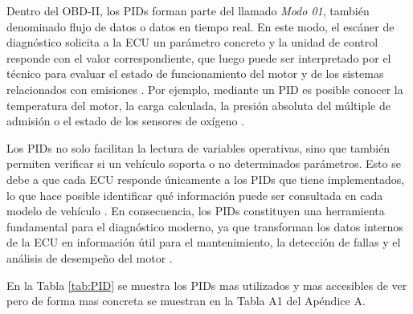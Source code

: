 Dentro del OBD-II, los PIDs forman parte del llamado \textit{Modo 01}, también denominado flujo de datos o datos en tiempo real. En este modo, el escáner de diagnóstico solicita a la ECU un parámetro concreto y la unidad de control responde con el valor correspondiente, que luego puede ser interpretado por el técnico para evaluar el estado de funcionamiento del motor y de los sistemas relacionados con emisiones \citep{Wikibooks_PIDModo01, OBDII_Breve}. Por ejemplo, mediante un PID es posible conocer la temperatura del motor, la carga calculada, la presión absoluta del múltiple de admisión o el estado de los sensores de oxígeno \citep{Wikibooks_PIDModo01, OBDII_Breve}.

Los PIDs no solo facilitan la lectura de variables operativas, sino que también permiten verificar si un vehículo soporta o no determinados parámetros. Esto se debe a que cada ECU responde únicamente a los PIDs que tiene implementados, lo que hace posible identificar qué información puede ser consultada en cada modelo de vehículo \citep{Wikibooks_PIDModo01}. En consecuencia, los PIDs constituyen una herramienta fundamental para el diagnóstico moderno, ya que transforman los datos internos de la ECU en información útil para el mantenimiento, la detección de fallas y el análisis de desempeño del motor \citep{Geotab_OBDII, OBDII_Breve}.

En la Tabla \ref{tab:PID} se muestra los PIDs mas utilizados y mas accesibles de ver pero de forma mas concreta se muestran en la Tabla A1 del Apéndice A.

